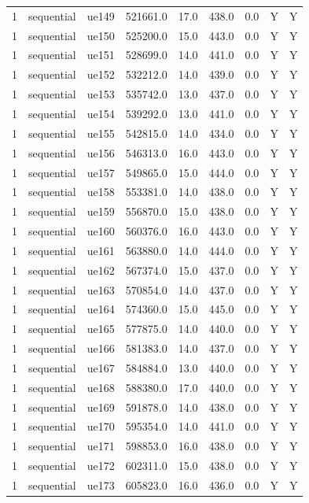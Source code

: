 \begin{table}[ht]
\begin{tabular}{|c|c|c|c|c|c|c|c|c|}
1 & sequential & ue149 & 521661.0 & 17.0 & 438.0 & 0.0 & Y & Y \\
1 & sequential & ue150 & 525200.0 & 15.0 & 443.0 & 0.0 & Y & Y \\
1 & sequential & ue151 & 528699.0 & 14.0 & 441.0 & 0.0 & Y & Y \\
1 & sequential & ue152 & 532212.0 & 14.0 & 439.0 & 0.0 & Y & Y \\
1 & sequential & ue153 & 535742.0 & 13.0 & 437.0 & 0.0 & Y & Y \\
1 & sequential & ue154 & 539292.0 & 13.0 & 441.0 & 0.0 & Y & Y \\
1 & sequential & ue155 & 542815.0 & 14.0 & 434.0 & 0.0 & Y & Y \\
1 & sequential & ue156 & 546313.0 & 16.0 & 443.0 & 0.0 & Y & Y \\
1 & sequential & ue157 & 549865.0 & 15.0 & 444.0 & 0.0 & Y & Y \\
1 & sequential & ue158 & 553381.0 & 14.0 & 438.0 & 0.0 & Y & Y \\
1 & sequential & ue159 & 556870.0 & 15.0 & 438.0 & 0.0 & Y & Y \\
1 & sequential & ue160 & 560376.0 & 16.0 & 443.0 & 0.0 & Y & Y \\
1 & sequential & ue161 & 563880.0 & 14.0 & 444.0 & 0.0 & Y & Y \\
1 & sequential & ue162 & 567374.0 & 15.0 & 437.0 & 0.0 & Y & Y \\
1 & sequential & ue163 & 570854.0 & 14.0 & 437.0 & 0.0 & Y & Y \\
1 & sequential & ue164 & 574360.0 & 15.0 & 445.0 & 0.0 & Y & Y \\
1 & sequential & ue165 & 577875.0 & 14.0 & 440.0 & 0.0 & Y & Y \\
1 & sequential & ue166 & 581383.0 & 14.0 & 437.0 & 0.0 & Y & Y \\
1 & sequential & ue167 & 584884.0 & 13.0 & 440.0 & 0.0 & Y & Y \\
1 & sequential & ue168 & 588380.0 & 17.0 & 440.0 & 0.0 & Y & Y \\
1 & sequential & ue169 & 591878.0 & 14.0 & 438.0 & 0.0 & Y & Y \\
1 & sequential & ue170 & 595354.0 & 14.0 & 441.0 & 0.0 & Y & Y \\
1 & sequential & ue171 & 598853.0 & 16.0 & 438.0 & 0.0 & Y & Y \\
1 & sequential & ue172 & 602311.0 & 15.0 & 438.0 & 0.0 & Y & Y \\
1 & sequential & ue173 & 605823.0 & 16.0 & 436.0 & 0.0 & Y & Y \\

\end{tabular}
\end{table}
